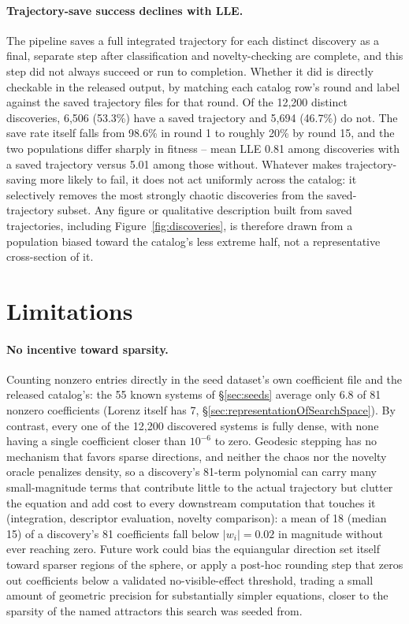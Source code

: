 \documentclass[11pt]{article}
\begin{document}
\paragraph{Trajectory-save success declines with LLE.}
\label{sec:trajectory-save-bias}
The pipeline saves a
full integrated trajectory for each distinct discovery as a final, separate
step after classification and novelty-checking are complete, and this step
did not always succeed or run to completion. Whether it did is directly
checkable in the released output, by matching each catalog row's round and
label against the saved trajectory files for that round. Of the 12{,}200
distinct discoveries, 6{,}506 (53.3\%) have a saved trajectory and 5{,}694
(46.7\%) do not. The save rate itself falls from 98.6\% in round 1 to
roughly 20\% by round 15, and the two populations differ sharply in fitness
-- mean LLE 0.81 among discoveries with a saved trajectory versus 5.01
among those without.
Whatever makes trajectory-saving more likely to fail, it does not act
uniformly across the catalog: it selectively removes the most strongly
chaotic discoveries from the saved-trajectory subset. Any figure or
qualitative description built from saved trajectories, including
Figure~\ref{fig:discoveries}, is therefore drawn from a population biased
toward the catalog's less extreme half, not a representative cross-section
of it.

\section{Limitations}
\label{sec:limitations}

\paragraph{No incentive toward sparsity.}
\label{sec:sparsity-limitation}
Counting nonzero entries directly
in the seed dataset's own coefficient file and the released catalog's: the
55 known systems of \S\ref{sec:seeds} average only 6.8 of 81 nonzero
coefficients (Lorenz itself has 7, \S\ref{sec:representationOfSearchSpace}). By contrast, every
one of the 12{,}200 discovered systems is fully dense, with none having a
single coefficient closer than $10^{-6}$ to zero. Geodesic stepping has no mechanism
that favors sparse directions, and neither the chaos nor the novelty oracle
penalizes density, so a discovery's 81-term polynomial can carry many
small-magnitude terms that contribute little to the actual trajectory but
clutter the equation and add cost to every downstream computation that
touches it (integration, descriptor evaluation, novelty comparison): a mean
of 18 (median 15) of a discovery's 81 coefficients fall below $|w_i| =
0.02$ in magnitude without ever reaching zero. Future work could bias the
equiangular direction set itself toward sparser regions of the sphere, or
apply a post-hoc rounding step that zeros out coefficients below a
validated no-visible-effect threshold, trading a small amount of
geometric precision for substantially simpler equations, closer to the
sparsity of the named attractors this search was seeded from.
\end{document}
